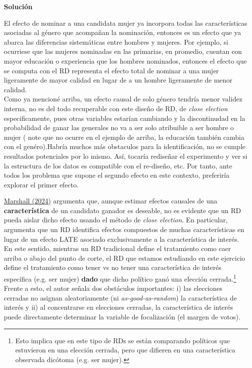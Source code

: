 \documentclass[a4paper, answers, addpoints, 11pt]{exam}
\newenvironment{solucion}{%
  \begin{mdframed}[
    backgroundcolor=blue!5,    %
    linecolor=blue!50,          %
    linewidth=2pt,              %
    leftmargin=10pt,            %
    rightmargin=8pt,           %
    topline=true,              %
    bottomline=true,            %
    roundcorner=10pt,           %
    innerleftmargin=10pt,       %
    innerrightmargin=10pt,      %
    innerbottommargin=10pt,     %
    innertopmargin=10pt         %
  ]%
  \begin{tcolorbox}[colframe=blue!50!black, colback=blue!50, coltitle=white, sharp corners=all, boxrule=1mm, width=\textwidth, halign=left, valign=center, top=0mm, bottom=0mm, left=0mm, right=0mm] \textbf{Solución} \end{tcolorbox} }{\end{mdframed}}
\begin{document}
\begin{enumerate}[resume]
\begin{enumerate}
\begin{solucion}
El efecto de nominar a una candidata mujer ya incorpora todas las características asociadas al género que acompañan la nominación, entonces es un efecto que ya abarca las diferencias sistemáticas entre hombres y mujeres. Por ejemplo, si ocurriese que las mujeres nominadas en las primarias, en promedio, cuentan con mayor educación o experiencia que los hombres nominados, entonces el efecto que se computa con el RD representa el efecto total de nominar a una mujer ligeramente de mayor calidad en lugar de a un hombre ligeramente de menor calidad.\\

Como ya mencioné arriba, un efecto causal de solo género tendría menor validez interna, no es del todo recuperable  con este diseño de RD, de \textit{close election } especificamente, pues otras variables estarían cambiando y la discontinudad en la probabilidad de ganar las generales no va a ser solo atribuible a ser hombre o mujer ( note que no ocurre en el ejemplo de arriba, la educación también cambia con el genéro).Habría muchos más obstaculos para la identificación, no se cumple resultados potenciales por lo mismo.  Así, tocaría rediseñar el experimento y ver si la estructura de los datos es compatible con el re-diseño, etc. Por tanto, ante todos los problema que supone el segundo efecto en este contexto, preferiría explorar el primer efecto.

\end{solucion}        
    \end{enumerate}
  
    
\end{enumerate}

\bigskip
    
\href{https://onlinelibrary-wiley-com.ezproxy.uniandes.edu.co/doi/full/10.1111/ajps.12741}{Marshall (2024)} argumenta que, aunque estimar efectos causales de una \textbf{característica} de un candidato ganador es deseable, no es evidente que un RD pueda aislar dicho efecto usando el método de \textit{close election}. En particular, argumenta que un RD identifica efectos compuestos de muchas características en lugar de un efecto LATE asociado exclusivamente a la característica de interés. \\

En este sentido, mientras un RD tradicional define el tratamiento como caer arriba o abajo del punto de corte, el RD que estamos estudiando en este ejercicio define el tratamiento como tener vs no tener una característica de interés específica (e.g. ser mujer) \textbf{dado} que dicho político ganó una elección cerrada.\footnote{Esto implica que en este tipo de RDs se están comparando políticos que estuvieron en una elección cerrada, pero que difieren en una característica observada dicótoma (e.g. ser mujer).} Frente a esto, el autor señala dos obstáculos importantes: i) las elecciones cerradas no asignan aleatoriamente (ni \textit{as-good-as-random}) la característica de interés y ii) al concentrarse en elecciones cerradas, la característica de interés puede directamente determinar la variable de focalización (el margen de votos). \\
\end{document}
